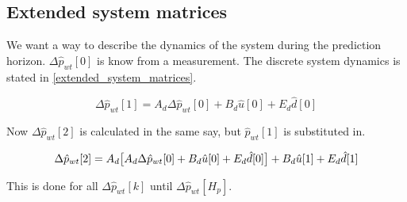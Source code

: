 \subsection{Extended system matrices}
\label{extended_system_matrices}

We want a way to describe the dynamics of the system during the prediction horizon. $\Delta \hat p_{wt}[0]$ is know from a measurement. 
The discrete system dynamics is stated in \eqref{extended_system_matrices}.

\begin{equation}
	\Delta \hat p_{wt}[1] = A_d\Delta \hat p_{wt}[0] + B_d \hat u[0] + E_d \hat d[0]
\end{equation}

Now $\Delta \hat p_{wt}[2]$ is calculated in the same say, but $\hat p_{wt}[1]$ is substituted in. 

\begin{equation}
	\Delta \hat p_{wt}[2] = A_d\big[A_d\Delta \hat p_{wt}[0] + B_d \hat u[0] + E_d \hat d[0]\big] + B_d \hat u[1] + E_d \hat d[1]\\ 
\end{equation}

This is done for all $\Delta \hat p_{wt}[k]$ until $\Delta \hat p_{wt}[H_p]$. 


